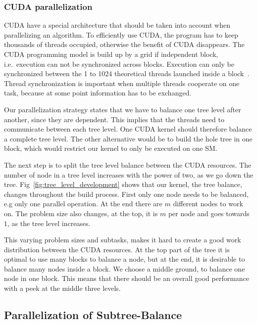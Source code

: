 \subsubsection{CUDA parallelization} %
\label{ssub:divide_work_on_cuda}

CUDA have a special architecture that should be taken into account when parallelizing an algorithm. To efficiently use CUDA, the program has to keep thousands of threads occupied, otherwise the benefit of CUDA disappears. The CUDA programming model is build up by a grid if independent block, i.e.\ execution can not be synchronized across blocks. Execution can only be synchronized between the 1 to 1024 theoretical threads launched inside a block~\cite{cuda_programming_guide}. Thread synchronization is important when multiple threads cooperate on one task, because at some point information has to be exchanged.

Our parallelization strategy states that we have to balance one tree level after another, since they are dependent. This implies that the threads need to communicate between each tree level. One CUDA kernel should therefore balance a complete tree level. The other alternative would be to build the hole tree in one block, which would restrict our kernel to only be executed on one SM\@.

The next step is to split the tree level balance between the CUDA resources. The number of node in a tree level increases with the power of two, as we go down the tree. Fig~\ref{fig:tree_level_development} shows that our kernel, the tree balance, changes throughout the build process. First only one node needs to be balanced, e.g only one parallel operation. At the end there are $m$ different nodes to work on. The problem size also changes, at the top, it is $m$ per node and goes towards $1$, as the tree level increases.

This varying problem sizes and subtasks, makes it hard to create a good work distribution between the CUDA resources. At the top part of the tree it is optimal to use many blocks to balance a node, but at the end, it is desirable to balance many nodes inside a block. We choose a middle ground, to balance one node in one block. This means that there should be an overall good performance with a peek at the middle three levels.

\subsection{Parallelization of Subtree-Balance} %
\label{ssub:selecting_a_algorithm}

